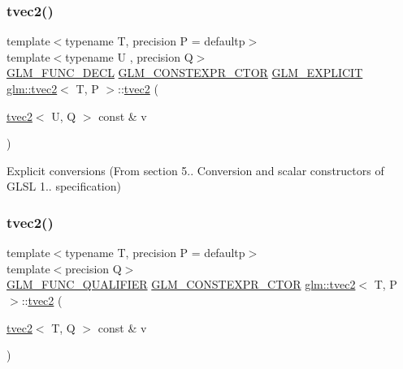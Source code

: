 \subsubsection{\texorpdfstring{tvec2()}{tvec2()}\hspace{0.1cm}{\footnotesize\ttfamily [11/17]}}
{\footnotesize\ttfamily template$<$typename T, precision P = defaultp$>$ \\
template$<$typename U , precision Q$>$ \\
\mbox{\hyperlink{setup_8hpp_ab2d052de21a70539923e9bcbf6e83a51}{G\+L\+M\+\_\+\+F\+U\+N\+C\+\_\+\+D\+E\+CL}} \mbox{\hyperlink{setup_8hpp_ad34178a09666081abdb573c14d1f4a5a}{G\+L\+M\+\_\+\+C\+O\+N\+S\+T\+E\+X\+P\+R\+\_\+\+C\+T\+OR}} \mbox{\hyperlink{setup_8hpp_a6c74f5a5e7b134ab69023ff9a30d4d5d}{G\+L\+M\+\_\+\+E\+X\+P\+L\+I\+C\+IT}} \mbox{\hyperlink{structglm_1_1tvec2}{glm\+::tvec2}}$<$ T, P $>$\+::\mbox{\hyperlink{structglm_1_1tvec2}{tvec2}} (\begin{DoxyParamCaption}\item[{\mbox{\hyperlink{structglm_1_1tvec2}{tvec2}}$<$ U, Q $>$ const \&}]{v }\end{DoxyParamCaption})}



Explicit conversions (From section 5.. Conversion and scalar constructors of G\+L\+SL 1.. specification) 

\mbox{\label{structglm_1_1tvec2_a47853ad220033f45cf430dc6b997ad93}} 
\subsubsection{\texorpdfstring{tvec2()}{tvec2()}\hspace{0.1cm}{\footnotesize\ttfamily [12/17]}}
{\footnotesize\ttfamily template$<$typename T, precision P = defaultp$>$ \\
template$<$precision Q$>$ \\
\mbox{\hyperlink{setup_8hpp_a33fdea6f91c5f834105f7415e2a64407}{G\+L\+M\+\_\+\+F\+U\+N\+C\+\_\+\+Q\+U\+A\+L\+I\+F\+I\+ER}} \mbox{\hyperlink{setup_8hpp_ad34178a09666081abdb573c14d1f4a5a}{G\+L\+M\+\_\+\+C\+O\+N\+S\+T\+E\+X\+P\+R\+\_\+\+C\+T\+OR}} \mbox{\hyperlink{structglm_1_1tvec2}{glm\+::tvec2}}$<$ T, P $>$\+::\mbox{\hyperlink{structglm_1_1tvec2}{tvec2}} (\begin{DoxyParamCaption}\item[{\mbox{\hyperlink{structglm_1_1tvec2}{tvec2}}$<$ T, Q $>$ const \&}]{v }\end{DoxyParamCaption})}



